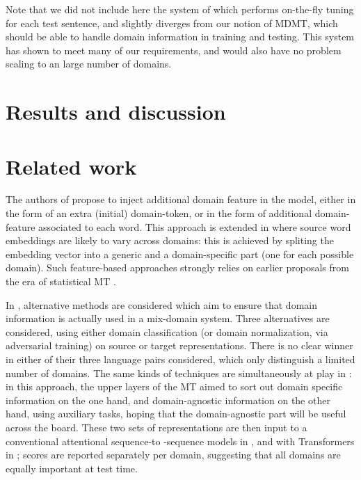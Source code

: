 \documentclass[11pt]{article}
\newcommand{\fyTodo}[1]{\Todo[FY:]{\textcolor{orange}{#1}}}
\begin{document}
Note that we did not include here the system of \cite{Farajian17multidomain} which performs on-the-fly tuning for each test sentence, and slightly diverges from our notion of MDMT, which should be able to handle domain information in training and testing. This system has shown to meet many of our requirements, and would also have no problem scaling to an large number of domains.\fyTodo{TBC}

\section{Results and discussion \label{sec:results}}

\section{Related work \label{sec:related}}


The authors of \cite{Kobus17domaincontrol} propose to inject additional domain feature in the model, either in the form of an extra (initial) domain-token, or in the form of additional domain-feature associated to each word. This approach is extended in \cite{Pham19generic} where source word embeddings are likely to vary across domains: this is achieved by spliting the embedding vector into a generic and a domain-specific part (one for each possible domain). Such feature-based approaches strongly relies on earlier proposals from the era of statistical MT \cite{Daume07frustratingly,Clark12onesystem}.

In \cite{Britz17mixing}, alternative methods are considered which aim to ensure that domain information is actually used in a mix-domain system. Three alternatives are considered, using either domain classification (or domain normalization, via adversarial training) on source or target representations. There is no clear winner in either of their three language pairs considered, which only distinguish a limited number of domains. The same kinds of techniques are simultaneously at play in \cite{Zeng18multidomain,Su19exploring}: in this approach, the upper layers of the MT aimed to sort out domain specific information on the one hand, and domain-agnostic information on the other hand, using auxiliary tasks, hoping that the domain-agnostic part will be useful across the board. These two sets of representations are then input to a conventional attentional sequence-to -sequence models in \cite{Zeng18multidomain}, and with Transformers in \cite{Su19exploring}; scores are reported separately per domain, suggesting that all domains are equally important at test time.
\end{document}
